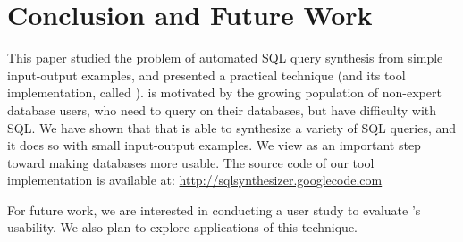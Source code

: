 \section{Conclusion and Future Work}
\label{sec:conclusion}




This paper studied the problem of automated SQL query synthesis
from simple input-output examples, and presented a
practical technique (and its tool implementation, called \ourtool).
\ourtool is motivated by the growing population of
non-expert database users, who need to query on their
databases, but have difficulty with SQL.
We have shown that that \ourtool is
able to synthesize a variety of SQL queries,
and it does so with small input-output examples. We view
\ourtool as an important step toward making databases
more usable.
The source code of our tool implementation is available at: 
\url{http://sqlsynthesizer.googlecode.com}


For future work, we are interested in conducting a user study
to evaluate \ourtool's usability. We also plan to explore
applications of this technique.

\vspace{1mm}

\begin{comment}
Our future work will concentrate on the following topics:

\textbf{Enrich the supported SQL subset.} We plan to enrich the
supported SQL subset by \ourtool, and design a corresponding algorithm
to synthesize more general queries.

\textbf{Illustration of synthesis steps.} Besides
producing a final result, end-users may also be interested in knowing
how a SQL query is inferred step by step.
Showing detailed inference steps not
only makes \ourtool more usable, but also permits
end-users to better understand the whole process and
spot possible errors earlier.
We plan to apply recent advance in data visualization~\cite{Kandel:2011}
to the context of program synthesis.

\textbf{Noise detection and tolerance in users' inputs.} The current technique
requires users to provide noise-free input-output examples.
Even in the presence of a small amount of user-input noises (e.g., a typo),
the inference algorithm will declare failure when it fails to learn
a valid SQL query.
To overcome this limitation, we plan to design a more robust inference
algorithm that can attempt to identify and tolerate user-input noises,
and even suggest a fix to the noisy example.

\end{comment}


